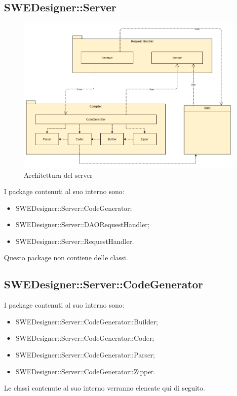 \documentclass[../DefinizioneDiProdotto.tex]{subfiles}
\begin{document}
			\subsection{SWEDesigner::Server}
			\begin{figure}[H]\label{fig:ServerSubsystem}
				\centering
				\includegraphics[scale=0.4]{Immagini/DiagrammaArchitettura/ServerSubsystem.png}
				\caption{Architettura del server}
			\end{figure}
			I package contenuti al suo interno sono:
			\begin{itemize}
				\item SWEDesigner::Server::CodeGenerator;
				\item SWEDesigner::Server::DAORequestHandler;
				\item SWEDesigner::Server::RequestHandler.
			\end{itemize}
			Questo package non contiene delle classi.
			
			\subsection{SWEDesigner::Server::CodeGenerator}
			I package contenuti al suo interno sono:
			\begin{itemize}
				\item SWEDesigner::Server::CodeGenerator::Builder;
				\item SWEDesigner::Server::CodeGenerator::Coder;
				\item SWEDesigner::Server::CodeGenerator::Parser;
				\item SWEDesigner::Server::CodeGenerator::Zipper.
			\end{itemize}
			Le classi contenute al suo interno verranno elencate qui di seguito.
			
\end{document}
